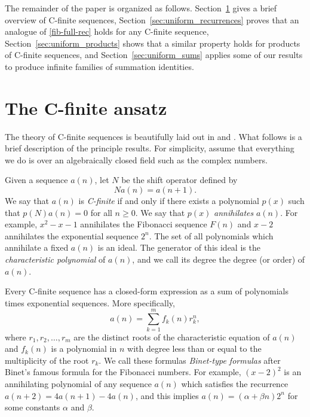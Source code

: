 \documentclass[12pt]{article}
\begin{document}
The remainder of the paper is organized as follows. 
Section~\ref{sec:definitions} gives a brief overview of C-finite sequences,
Section~\ref{sec:uniform_recurrences} proves that an analogue of
\eqref{fib-full-rec} holds for any C-finite sequence,
Section~\ref{sec:uniform_products} shows that a similar property holds for
products of C-finite sequences, and Section~\ref{sec:uniform_sums} applies some
of our results to produce infinite families of summation identities.

\section{The C-finite ansatz}%
\label{sec:definitions}

The theory of C-finite sequences is beautifully laid out in \cite{concrete} and
\cite{ansatz}. What follows is a brief description of the principle results.
For simplicity, assume that everything we do is over an algebraically closed
field such as the complex numbers.

Given a sequence $a(n)$, let $N$ be the shift operator defined by
\begin{equation*}
    Na(n) = a(n + 1).
\end{equation*}
We say that $a(n)$ is \emph{C-finite} if and only if there exists a polynomial
$p(x)$ such that $p(N) a(n) = 0$ for all $n \geq 0$. We say that $p(x)$
\emph{annihilates} $a(n)$. For example, $x^2 - x - 1$ annihilates the Fibonacci
sequence $F(n)$ and $x - 2$ annihilates the exponential sequence $2^n$. The set
of all polynomials which annihilate a fixed $a(n)$ is an ideal. The generator
of this ideal is the \emph{characteristic polynomial} of $a(n)$, and we call
its degree the degree (or order) of $a(n)$.

Every C-finite sequence has a closed-form expression as a sum of polynomials
times exponential sequences. More specifically,
\begin{equation*}
    a(n) = \sum_{k = 1}^m f_k(n) r_k^n,
\end{equation*}
where $r_1, r_2, \dots, r_m$ are the distinct roots of the characteristic
equation of $a(n)$ and $f_k(n)$ is a polynomial in $n$ with degree less than or
equal to the multiplicity of the root $r_k$. We call these formulas
\emph{Binet-type formulas} after Binet's famous formula for the Fibonacci
numbers. For example, $(x - 2)^2$ is an annihilating polynomial of any sequence
$a(n)$ which satisfies the recurrence $a(n + 2) = 4 a(n + 1) - 4 a(n)$, and
this implies $a(n) = (\alpha + \beta n)2^n$ for some constants $\alpha$ and
$\beta$.
\end{document}
